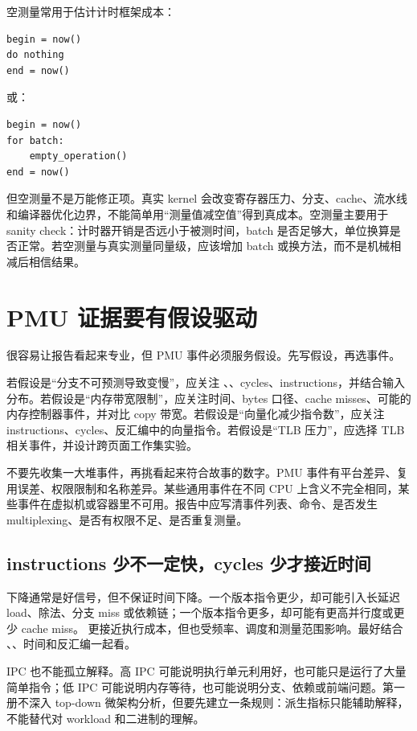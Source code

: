 空测量常用于估计计时框架成本：

\begin{lstlisting}
begin = now()
do nothing
end = now()
\end{lstlisting}

或：

\begin{lstlisting}
begin = now()
for batch:
    empty_operation()
end = now()
\end{lstlisting}

但空测量不是万能修正项。真实 kernel 会改变寄存器压力、分支、cache、流水线和编译器优化边界，不能简单用“测量值减空值”得到真成本。空测量主要用于 sanity check：计时器开销是否远小于被测时间，batch 是否足够大，单位换算是否正常。若空测量与真实测量同量级，应该增加 batch 或换方法，而不是机械相减后相信结果。

\section{PMU 证据要有假设驱动}

 很容易让报告看起来专业，但 PMU 事件必须服务假设。先写假设，再选事件。

若假设是“分支不可预测导致变慢”，应关注 、、cycles、instructions，并结合输入分布。若假设是“内存带宽限制”，应关注时间、bytes 口径、cache misses、可能的内存控制器事件，并对比 copy 带宽。若假设是“向量化减少指令数”，应关注 instructions、cycles、反汇编中的向量指令。若假设是“TLB 压力”，应选择 TLB 相关事件，并设计跨页面工作集实验。

不要先收集一大堆事件，再挑看起来符合故事的数字。PMU 事件有平台差异、复用误差、权限限制和名称差异。某些通用事件在不同 CPU 上含义不完全相同，某些事件在虚拟机或容器里不可用。报告中应写清事件列表、命令、是否发生 multiplexing、是否有权限不足、是否重复测量。

\subsection{instructions 少不一定快，cycles 少才接近时间}

 下降通常是好信号，但不保证时间下降。一个版本指令更少，却可能引入长延迟 load、除法、分支 miss 或依赖链；一个版本指令更多，却可能有更高并行度或更少 cache miss。  更接近执行成本，但也受频率、调度和测量范围影响。最好结合 、、时间和反汇编一起看。

IPC 也不能孤立解释。高 IPC 可能说明执行单元利用好，也可能只是运行了大量简单指令；低 IPC 可能说明内存等待，也可能说明分支、依赖或前端问题。第一册不深入 top-down 微架构分析，但要先建立一条规则：派生指标只能辅助解释，不能替代对 workload 和二进制的理解。

